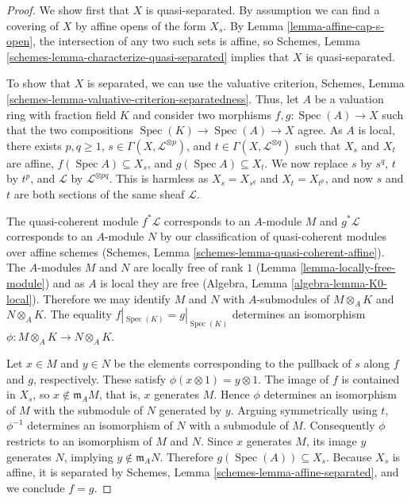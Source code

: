 \documentclass[10pt,a4paper]{amsart}
\theoremstyle{plain}
\theoremstyle{definition}
\theoremstyle{remark}
\numberwithin{equation}{subsection}
\def\Spec{\mathop{\mathrm{Spec}}}
\begin{document}
\begin{proof}
We show first that $X$ is quasi-separated.  By assumption we
can find a covering of $X$ by affine opens of the form
$X_s$.  By Lemma \ref{lemma-affine-cap-s-open}, the
intersection of any two such sets is affine, so Schemes, Lemma
\ref{schemes-lemma-characterize-quasi-separated} implies
that $X$ is quasi-separated.

\medskip\noindent
To show that $X$ is separated, we can use the valuative
criterion, Schemes, Lemma
\ref{schemes-lemma-valuative-criterion-separatedness}.
Thus, let $A$ be a valuation ring with fraction field $K$
and consider two morphisms $f, g : \Spec(A) \to X$ such that
the two compositions $\Spec(K) \to \Spec(A) \to X$ agree.
As $A$ is local, there exists $p, q \ge 1$, $s \in \Gamma(X,
\mathcal{L}^{\otimes p})$, and $t \in \Gamma(X,
\mathcal{L}^{\otimes q})$ such that $X_s$ and $X_t$ are
affine, $f(\Spec A) \subseteq X_s$, and $g(\Spec A)
\subseteq X_t$.  We now replace $s$ by $s^q$, $t$ by $t^p$,
and $\mathcal{L}$ by $\mathcal{L}^{\otimes pq}$.  This is
harmless as $X_s = X_{s^q}$ and $X_t = X_{t^p}$, and now $s$
and $t$ are both sections of the same sheaf $\mathcal{L}$.

\medskip\noindent
The quasi-coherent module $f^*\mathcal{L}$ corresponds to an $A$-module $M$ and
$g^*\mathcal{L}$ corresponds to an $A$-module $N$ by our
classification of quasi-coherent modules over affine schemes
(Schemes, Lemma \ref{schemes-lemma-quasi-coherent-affine}).
The $A$-modules $M$ and $N$ are locally free of rank
$1$ (Lemma \ref{lemma-locally-free-module}) and as $A$ is
local they are free (Algebra, Lemma
\ref{algebra-lemma-K0-local}).  Therefore we may identify
$M$ and $N$ with $A$-submodules of $M \otimes_A K$ and $N
\otimes_A K$.  The equality $f|_{\Spec(K)} = g|_{\Spec(K)}$
determines an isomorphism $\phi \colon M \otimes_A K \to N
\otimes_A K$.

\medskip\noindent
Let $x \in M$ and $y \in N$ be the elements corresponding to
the pullback of $s$ along $f$ and $g$, respectively.  These
satisfy $\phi(x \otimes 1) = y \otimes 1$.  The image of $f$
is contained in $X_s$, so $x \not\in \mathfrak{m}_A M$, that
is, $x$ generates $M$.  Hence $\phi$ determines an
isomorphism of $M$ with the submodule of $N$ generated by
$y$.  Arguing symmetrically using $t$, $\phi^{-1}$
determines an isomorphism of $N$ with a submodule of $M$.
Consequently $\phi$ restricts to an isomorphism of $M$ and
$N$.  Since $x$ generates $M$, its image $y$ generates
$N$, implying $y \not\in \mathfrak{m}_A N$.  Therefore
$g(\Spec(A)) \subseteq X_s$.  Because $X_s$ is affine, it is
separated by Schemes, Lemma \ref{schemes-lemma-affine-separated},
and we conclude $f = g$.
\end{proof}
\end{document}
